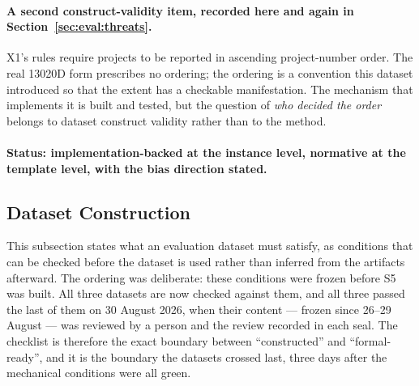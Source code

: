 \paragraph{A second construct-validity item, recorded here and again in
Section~\ref{sec:eval:threats}.}
X1's rules require projects to be reported in ascending project-number order. The real 13020D
form prescribes no ordering; the ordering is a convention this dataset introduced so that the
extent has a checkable manifestation. The mechanism that implements it is built and tested,
but the question of \emph{who decided the order} belongs to dataset construct validity rather
than to the method.

\paragraph{Status: implementation-backed at the instance level, normative at the template
level, with the bias direction stated.}

\subsection{Dataset Construction}
\label{sec:eval:dataset}


This subsection states what an evaluation dataset must satisfy, as conditions that can be
checked before the dataset is used rather than inferred from the artifacts afterward. The
ordering was deliberate: these conditions were frozen before S5 was built. All three datasets
are now checked against them, and all three passed the last of them on 30 August 2026, when
their content --- frozen since 26--29 August --- was reviewed by a person and the review
recorded in each seal. The checklist is therefore the exact boundary between ``constructed''
and ``formal-ready'', and it is the boundary the datasets crossed last, three days after the
mechanical conditions were all green.

